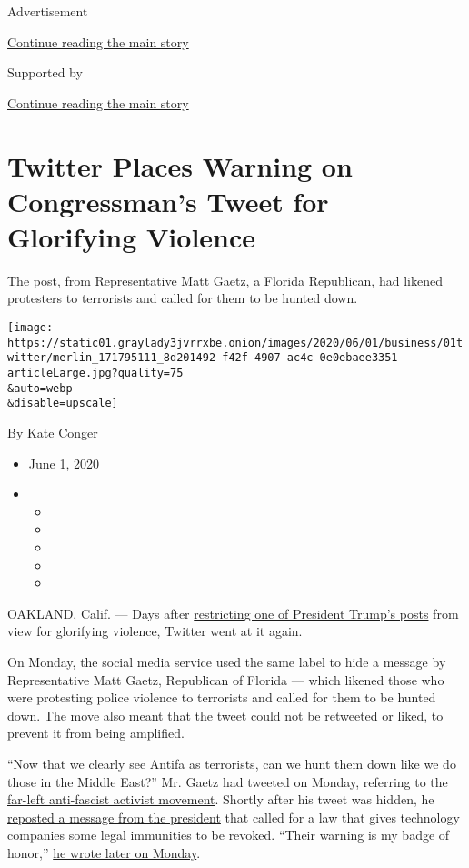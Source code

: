 Advertisement

\protect\hyperlink{after-top}{Continue reading the main story}

Supported by

\protect\hyperlink{after-sponsor}{Continue reading the main story}

\hypertarget{twitter-places-warning-on-congressmans-tweet-for-glorifying-violence}{%
\section{Twitter Places Warning on Congressman's Tweet for Glorifying
Violence}\label{twitter-places-warning-on-congressmans-tweet-for-glorifying-violence}}

The post, from Representative Matt Gaetz, a Florida Republican, had
likened protesters to terrorists and called for them to be hunted down.

\texttt{[image: https://static01.graylady3jvrrxbe.onion/images/2020/06/01/business/01twitter/merlin\_171795111\_8d201492-f42f-4907-ac4c-0e0ebaee3351-articleLarge.jpg?quality=75\\\&auto=webp\\\&disable=upscale]}

By \href{https://www.nytimes3xbfgragh.onion/by/kate-conger}{Kate Conger}

\begin{itemize}
\item
  June 1, 2020
\item
  \begin{itemize}
  \item
  \item
  \item
  \item
  \item
  \end{itemize}
\end{itemize}

OAKLAND, Calif. --- Days after
\href{https://www.nytimes3xbfgragh.onion/2020/05/29/technology/trump-twitter-minneapolis-george-floyd.html}{restricting
one of President Trump's posts} from view for glorifying violence,
Twitter went at it again.

On Monday, the social media service used the same label to hide a
message by Representative Matt Gaetz, Republican of Florida --- which
likened those who were protesting police violence to terrorists and
called for them to be hunted down. The move also meant that the tweet
could not be retweeted or liked, to prevent it from being amplified.

``Now that we clearly see Antifa as terrorists, can we hunt them down
like we do those in the Middle East?'' Mr. Gaetz had tweeted on Monday,
referring to the
\href{https://www.nytimes3xbfgragh.onion/article/what-antifa-trump.html}{far-left
anti-fascist activist movement}. Shortly after his tweet was hidden, he
\href{https://twitter.com/mattgaetz/status/1267605537790853133}{reposted
a message from the president} that called for a law that gives
technology companies some legal immunities to be revoked. ``Their
warning is my badge of honor,''
\href{https://twitter.com/mattgaetz/status/1267615035767107586}{he wrote
later on Monday}.

